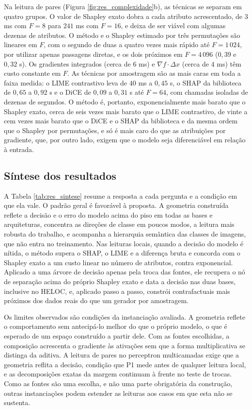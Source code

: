 Na leitura de pares (Figura \ref{fig:res_complexidade}b), as técnicas se separam em quatro grupos. O valor de Shapley exato dobra a cada atributo acrescentado, de $3$ ms com $F = 8$ para $241$ ms com $F = 16$, e deixa de ser viável com algumas dezenas de atributos. O método e o Shapley estimado por três permutações são lineares em $F$, com o segundo de duas a quatro vezes mais rápido até $F = 1\,024$, por utilizar apenas passagens diretas, e os dois próximos em $F = 4\,096$ ($0{,}39$ e $0{,}32$ s). Os gradientes integrados (cerca de $6$ ms) e $\nabla f\cdot\Delta x$ (cerca de $4$ ms) têm custo constante em $F$. As técnicas por amostragem são as mais caras em toda a faixa medida: o LIME contrastivo leva de $40$ ms a $0{,}45$ s, o SHAP da biblioteca de $0{,}65$ a $0{,}92$ s e o DiCE de $0{,}09$ a $0{,}31$ s até $F = 64$, com chamadas isoladas de dezenas de segundos. O método é, portanto, exponencialmente mais barato que o Shapley exato, cerca de seis vezes mais barato que o LIME contrastivo, de vinte a cem vezes mais barato que o DiCE e o SHAP da biblioteca e da mesma ordem que o Shapley por permutações, e só é mais caro do que as atribuições por gradiente, que, por outro lado, exigem que o modelo seja diferenciável em relação à entrada.

\subsection{Síntese dos resultados}\label{subsec:res_sintese}

A Tabela \ref{tab:res_sintese} resume a resposta a cada pergunta e a condição em que ela vale. O padrão geral é favorável à proposta. A geometria construída reflete a decisão e o erro do modelo acima do piso em todas as bases e arquiteturas, concentra as direções de classe em poucos modos, a leitura mais robusta do trabalho, e acompanha a hierarquia semântica das classes de imagens, que não entra no treinamento. Nas leituras locais, quando a decisão do modelo é nítida, o método supera o SHAP, o LIME e a diferença bruta e concorda com o Shapley exato a um custo linear no número de atributos, contra exponencial. Aplicado a uma árvore de decisão apenas pela troca das fontes, ele recupera o nó de separação acima do próprio Shapley exato e data a decisão nas duas bases, inclusive no HELOC, e, aplicado passo a passo, constrói contrafactuais mais próximos dos dados reais do que um gerador por amostragem.

Os limites observados são condições da instanciação avaliada. A geometria reflete o comportamento sem antecipá-lo melhor do que o próprio modelo, o que é esperado de um espaço construído a partir dele. Com as fontes escolhidas, a composição acrescenta o gradiente às ativações sem que a forma multiplicativa se distinga da aditiva. A leitura de pares no perceptron multicamadas exige que a geometria reflita a decisão, condição que P1 mede antes de qualquer leitura local, e as decomposições exatas da margem continuam à frente no teste de trocas. Como as fontes são uma escolha, e não uma parte obrigatória da construção, outras instanciações podem estender as leituras aos casos em que esta não se sustenta.

